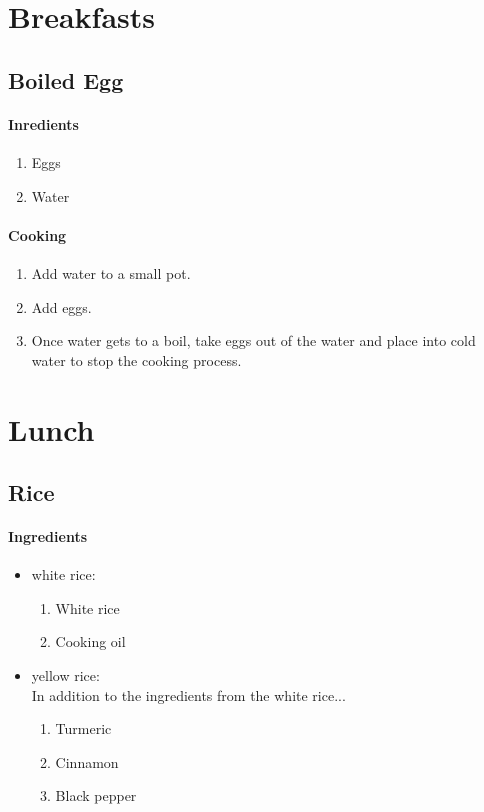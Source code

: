 
\chapter{Breakfasts}
\section{Boiled Egg}
\subsubsection{Inredients}
\begin{enumerate}
    \item Eggs
    \item Water
\end{enumerate}

\subsubsection{Cooking}
\begin{enumerate}
    \item Add water to a small pot.
    \item Add eggs.
    \item Once water gets to a boil, take eggs out of the water and place into cold water to stop the cooking process.
\end{enumerate}

\chapter{Lunch}
\section{Rice}
\subsubsection{Ingredients}
\begin{itemize}
    \item white rice:
    \begin{enumerate}
        \item White rice
        \item Cooking oil
    \end{enumerate}
    \item yellow rice:\\ In addition to the ingredients from the white rice...
    \begin{enumerate}
        \item Turmeric
        \item Cinnamon
        \item Black pepper
    \end{enumerate}
\end{itemize}

